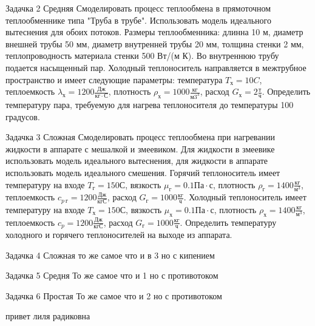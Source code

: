 Задачка 2 Средняя
Смоделировать процесс теплообмена в прямоточном теплообменнике типа "Труба в трубе". Использовать модель идеального вытеснения для обоих потоков. Размеры теплообменника: длинна 10 м, диаметр внешней трубы 50 мм, диаметр внутренней трубы 20 мм, толщина стенки 2 мм, теплопроводность материала стенки 500 Вт/(м К). Во внутреннюю трубу подается насыщенный пар. Холодный теплоноситель направляется в межтрубное пространство и имеет следующие параметры: температура $T_х=10 C$, теплоемкость $\lambda_х=1200\frac{Дж}{кг \cdot С}$, плотность $\rho_х=1000 \frac{кг}{м3^3}$, расход $G_х=2 \frac{т}{ч}$.
Определить температуру пара, требуемую для нагрева теплоносителя до температуры 100 градусов. 

Задачка 3 Сложная
Смоделировать процесс теплообмена при нагревании жидкости в аппарате с мешалкой и змеевиком. Для жидкости в змеевике использовать модель идеального вытеснения, для жидкости в аппарате использовать модель идеального смешения. Горячий теплоноситель имеет температуру на входе $T_г=150 С$, вязкость $\mu_г=0.1 Па\cdot с$, плотность  $\rho_г= 1400 \frac{кг}{м^3}$, теплоемкость $c_{p\ г}=1200 \frac{Дж}{кг С}$, расход $G_г=1000 \frac{кг}{ч}$. Холодный теплоноситель имеет температуру на входе $T_х=150 С$, вязкость $\mu_х=0.1 Па\cdot с$, плотность  $\rho_х= 1400 \frac{кг}{м^3}$, теплоемкость $c_p=1200 \frac{Дж}{кг С}$, расход $G_г=1000 \frac{кг}{ч}$. Определить температуру холодного и горячего теплоносителей на выходе из аппарата.

Задачка 4 Сложная то же самое что и в 3 но с кипением

Задачка 5 Средня То же самое что и 1 но с противотоком

Задачка 6 Простая То же самое что и 2 но с противотоком

привет лиля радиковна
